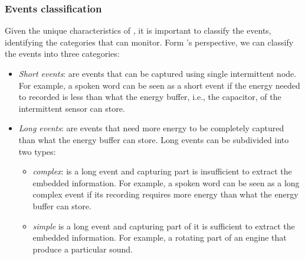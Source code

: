 \subsubsection{Events classification}
\label{sec:event_classification}
Given the unique characteristics of \sys, it is important to classify the events, identifying the categories that \sys can monitor. Form \sys's perspective, we can classify the events into three categories:
\begin{itemize}
%
\item \textit{Short events}: are events that can be captured using single intermittent node. 
For example, a spoken word can be seen as a short event if the energy needed to recorded is less than what the energy buffer, i.e., the capacitor, of the intermittent sensor can store.
\item \textit{Long events}: are events that need more energy to be completely captured than what the energy buffer can store. Long events can be subdivided into two types: 
	\begin{itemize}
		\item \textit{complex}: is a long event and capturing part is insufficient to extract the embedded information.  For example, a spoken word can be seen as a long complex event if its recording requires more energy than what the energy buffer can store.

		\item \textit{simple} is a long event and capturing part of it is sufficient to extract the embedded information. For example, a rotating part of an engine that produce a particular sound. 
	\end{itemize}
\end{itemize}

